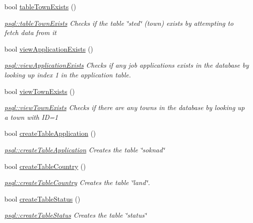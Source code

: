 \begin{DoxyCompactItemize}
bool \mbox{\hyperlink{classpsql_a717162b7d7faa0fb41b5a526e42de4ac}{table\+Town\+Exists}} ()
\begin{DoxyCompactList}\small\item\em \mbox{\hyperlink{classpsql_a717162b7d7faa0fb41b5a526e42de4ac}{psql\+::table\+Town\+Exists}} Checks if the table \char`\"{}sted\char`\"{} (town) exists by attempting to fetch data from it \end{DoxyCompactList}\item 
bool \mbox{\hyperlink{classpsql_a4c23d467c41e155a55c38b1cefb9b54b}{view\+Application\+Exists}} ()
\begin{DoxyCompactList}\small\item\em \mbox{\hyperlink{classpsql_a4c23d467c41e155a55c38b1cefb9b54b}{psql\+::view\+Application\+Exists}} Checks if any job applications exists in the database by looking up index 1 in the application table. \end{DoxyCompactList}\item 
bool \mbox{\hyperlink{classpsql_aae95eb2a505c1b0b7b4d5671926ecd2f}{view\+Town\+Exists}} ()
\begin{DoxyCompactList}\small\item\em \mbox{\hyperlink{classpsql_aae95eb2a505c1b0b7b4d5671926ecd2f}{psql\+::view\+Town\+Exists}} Checks if there are any towns in the database by looking up a town with ID=1 \end{DoxyCompactList}\item 
bool \mbox{\hyperlink{classpsql_a36f6a197a2214b9c71cfcd620334835d}{create\+Table\+Application}} ()
\begin{DoxyCompactList}\small\item\em \mbox{\hyperlink{classpsql_a36f6a197a2214b9c71cfcd620334835d}{psql\+::create\+Table\+Application}} Creates the table \char`\"{}soknad\char`\"{} \end{DoxyCompactList}\item 
bool \mbox{\hyperlink{classpsql_ab6e496d8471f3cd9c5c082a6ba75c25b}{create\+Table\+Country}} ()
\begin{DoxyCompactList}\small\item\em \mbox{\hyperlink{classpsql_ab6e496d8471f3cd9c5c082a6ba75c25b}{psql\+::create\+Table\+Country}} Creates the table \char`\"{}land\char`\"{}. \end{DoxyCompactList}\item 
bool \mbox{\hyperlink{classpsql_a427ad0f483c8ab7a4d23912278bc69e8}{create\+Table\+Status}} ()
\begin{DoxyCompactList}\small\item\em \mbox{\hyperlink{classpsql_a427ad0f483c8ab7a4d23912278bc69e8}{psql\+::create\+Table\+Status}} Creates the table \char`\"{}status\char`\"{} \end{DoxyCompactList}\item 

\end{DoxyCompactItemize}
